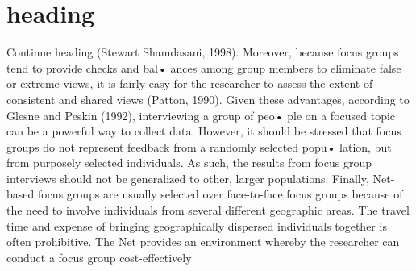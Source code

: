 \documentclass{beamer}
\begin{document}
\section{ heading}
\begin{frame}{Continue heading}
(Stewart Shamdasani, 1998). Moreover, because focus groups tend to provide
checks and bal• ances among group members to eliminate false or
extreme views, it is fairly easy for the researcher to assess the extent of
consistent and shared views (Patton, 1990). Given these advantages, according
to Glesne and Peskin (1992), interviewing a group of peo• ple on
a focused topic can be a powerful way to collect data. However, it should
be stressed that focus groups do not represent feedback from a randomly
selected popu• lation, but from purposely selected individuals. As such,
the results from focus group interviews should not be generalized to other,
larger populations. Finally, Net-based focus groups are usually selected
over face-to-face focus groups because of the need to involve individuals
from several different geographic areas. The travel time and expense of
bringing geographically dispersed individuals together is often prohibitive.
The Net provides an environment whereby the researcher can conduct a
focus group cost-effectively
\end{frame}
\end{document}
